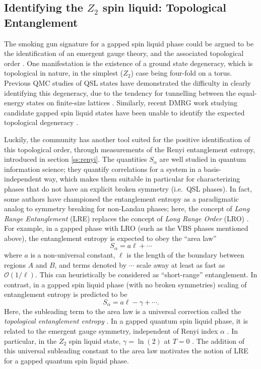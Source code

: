 \documentclass[range]{ar2e}
\begin{document}
\subsection{Identifying the $Z_2$ spin liquid: Topological Entanglement} 
\label{topoEEsec}

The smoking gun signature for a gapped spin liquid phase could be argued to be the identification of an emergent gauge theory,
and the associated topological order \cite{Wenbook}.  One manifestation is the existence of a ground state degeneracy, which is topological in nature, in the simplest ($Z_2$) case being four-fold on a torus.  Previous QMC studies of QSL states have demonstrated the difficulty in clearly identifying this degeneracy, due to the tendency for tunnelling between the equal-energy states on finite-size lattices \cite{Isakov1}.  Similarly, recent DMRG work studying candidate gapped spin liquid states have been unable to identify the expected topological degeneracy \cite{Yan,J1J2}.

Luckily, the community has another tool suited for the positive identification of this topological order, through measurements of the Renyi entanglement entropy, introduced in section \ref{ss:renyi}.  The quantities $S_{\alpha}$ are well studied in quantum information science; they quantify correlations for a system in a basis-independent way, which makes them suitable in particular for characterizing phases that do not have an explicit broken symmetry (i.e.~QSL phases).  In fact, some authors have championed the entanglement entropy as a paradigmatic analog to symmetry breaking for non-Landau phases; here, the concept of {\it Long Range Entanglement} (LRE) replaces the concept of {\it Long Range Order} (LRO) \cite{Wenbook}.  For example, in a gapped phase with LRO (such as the VBS phases mentioned above),
the entanglement entropy is expected to obey the ``area law''
\begin{equation} 
S_{\alpha} = a\ell + \cdots \label{arealaw}
\end{equation}
where $a$ is a non-universal constant, $\ell$ is the length of the boundary between regions $A$ and $B$, and terms denoted by $\cdots$ scale away at least as fast as $\mathcal{O} (1/\ell)$.  This can heuristically be considered as ``short-range'' entanglement.  In contrast, in a gapped spin liquid phase (with no broken symmetries)
scaling of entanglement entropy is predicted to be
\begin{equation}
S_{\alpha} = a \ell - \gamma + \cdots \label{areaL}.
\end{equation}
 Here, the subleading term to the area law is a universal correction called the {\it topological entanglement entropy} \cite{Alioscia1,Alioscia2,LW,KP}.  In a gapped quantum spin liquid phase, it is related to the emergent gauge symmetry, independent of Renyi index $\alpha$ \cite{Flammia}.  In particular, in the $Z_2$ spin liquid state, $\gamma =  \ln(2)$ at $T=0$ \cite{LW}.   The addition of this universal subleading constant to the area law motivates the notion of LRE for a gapped quantum spin liquid phase.
\end{document}
